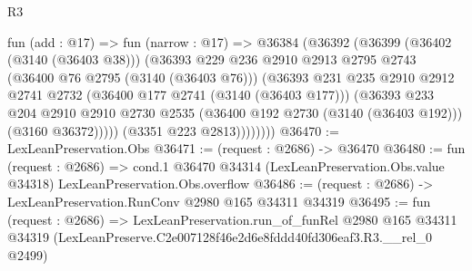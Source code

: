 \begin{lexlean}{R3}
\begin{coremodule}
              fun (add : @17) =>
              fun (narrow : @17) =>
              @36384
                (@36392
                  (@36399
                    (@36402 (@3140 (@36403 @38)))
                    (@36393
                      @229
                      @236
                      @2910
                      @2913
                      @2795
                      @2743
                      (@36400 @76 @2795 (@3140 (@36403 @76)))
                      (@36393
                        @231
                        @235
                        @2910
                        @2912
                        @2741
                        @2732
                        (@36400 @177 @2741 (@3140 (@36403 @177)))
                        (@36393
                          @233
                          @204
                          @2910
                          @2910
                          @2730
                          @2535
                          (@36400 @192 @2730 (@3140 (@36403 @192)))
                          (@3160 @36372)))))
                  (@3351 @223 @2813))))))))
@36470 := LexLeanPreservation.Obs
@36471 := (request : @2686) -> @36470
@36480 := fun (request : @2686) =>
  cond.{1} @36470 @34314 (LexLeanPreservation.Obs.value @34318) LexLeanPreservation.Obs.overflow
@36486 := (request : @2686) -> LexLeanPreservation.RunConv @2980 @165 @34311 @34319
@36495 := fun (request : @2686) =>
  LexLeanPreservation.run_of_funRel
    @2980
    @165
    @34311
    @34319
    (LexLeanPreserve.C2e007128f46e2d6e8fddd40fd306eaf3.R3.__rel_0 @2499)
\end{coremodule}
\end{lexlean}
